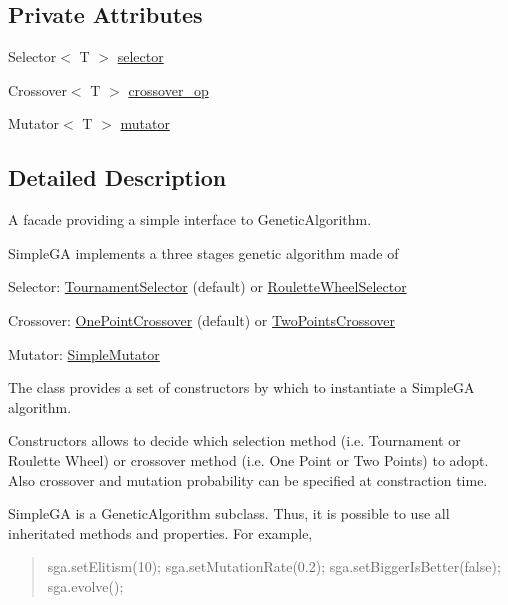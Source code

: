 \subsection*{Private Attributes}
\begin{DoxyCompactItemize}
\item 
Selector$<$ T $>$ \hyperlink{classjenes_1_1algorithms_1_1_simple_g_a_3_01_t_01extends_01_chromosome_01_4_a2490679bf43c4342c2932181788af8f3}{selector}
\item 
Crossover$<$ T $>$ \hyperlink{classjenes_1_1algorithms_1_1_simple_g_a_3_01_t_01extends_01_chromosome_01_4_a65f341dfdb563e499feac64facee9a21}{crossover\-\_\-op}
\item 
Mutator$<$ T $>$ \hyperlink{classjenes_1_1algorithms_1_1_simple_g_a_3_01_t_01extends_01_chromosome_01_4_a24f14989c009c5422614686c8fc49248}{mutator}
\end{DoxyCompactItemize}


\subsection{Detailed Description}
A facade providing a simple interface to Genetic\-Algorithm. 

{\ttfamily Simple\-G\-A} implements a three stages genetic algorithm made of 
\begin{DoxyItemize}
\item Selector\-: \hyperlink{}{Tournament\-Selector} (default) or \hyperlink{}{Roulette\-Wheel\-Selector} 
\item Crossover\-: \hyperlink{}{One\-Point\-Crossover} (default) or \hyperlink{}{Two\-Points\-Crossover} 
\item Mutator\-: \hyperlink{}{Simple\-Mutator} 
\end{DoxyItemize}The class provides a set of constructors by which to instantiate a {\ttfamily Simple\-G\-A} algorithm. 

Constructors allows to decide which selection method (i.\-e. Tournament or Roulette Wheel) or crossover method (i.\-e. One Point or Two Points) to adopt. Also crossover and mutation probability can be specified at constraction time. 

{\ttfamily Simple\-G\-A} is a {\ttfamily Genetic\-Algorithm} subclass. Thus, it is possible to use all inheritated methods and properties. For example, 

\begin{quotation}

\begin{DoxyPre}
 sga.setElitism(10);
 sga.setMutationRate(0.2);
 sga.setBiggerIsBetter(false);
 sga.evolve();
\end{DoxyPre}
\end{quotation}


